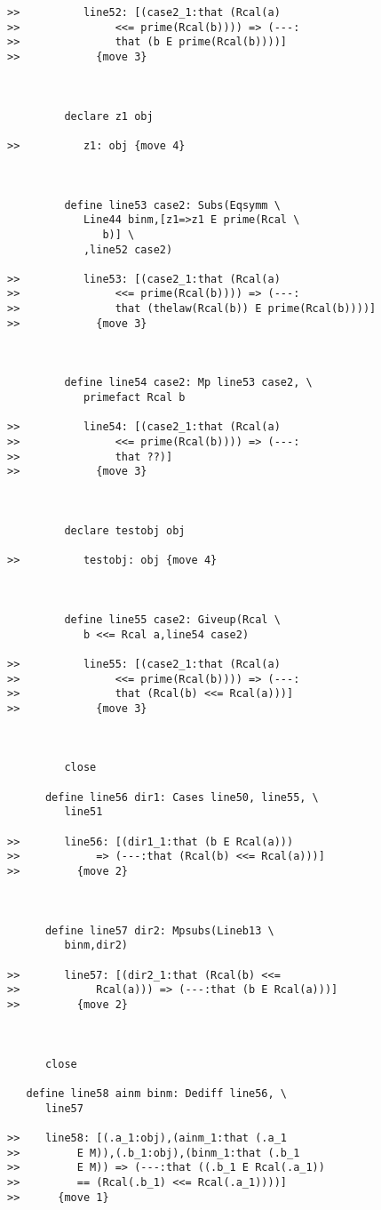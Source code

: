 \documentclass[12pt]{article}
\begin{document}
\begin{verbatim}
>>          line52: [(case2_1:that (Rcal(a)
>>               <<= prime(Rcal(b)))) => (---:
>>               that (b E prime(Rcal(b))))]
>>            {move 3}



         declare z1 obj

>>          z1: obj {move 4}



         define line53 case2: Subs(Eqsymm \
            Line44 binm,[z1=>z1 E prime(Rcal \
               b)] \
            ,line52 case2)

>>          line53: [(case2_1:that (Rcal(a)
>>               <<= prime(Rcal(b)))) => (---:
>>               that (thelaw(Rcal(b)) E prime(Rcal(b))))]
>>            {move 3}



         define line54 case2: Mp line53 case2, \
            primefact Rcal b

>>          line54: [(case2_1:that (Rcal(a)
>>               <<= prime(Rcal(b)))) => (---:
>>               that ??)]
>>            {move 3}



         declare testobj obj

>>          testobj: obj {move 4}



         define line55 case2: Giveup(Rcal \
            b <<= Rcal a,line54 case2)

>>          line55: [(case2_1:that (Rcal(a)
>>               <<= prime(Rcal(b)))) => (---:
>>               that (Rcal(b) <<= Rcal(a)))]
>>            {move 3}



         close

      define line56 dir1: Cases line50, line55, \
         line51

>>       line56: [(dir1_1:that (b E Rcal(a)))
>>            => (---:that (Rcal(b) <<= Rcal(a)))]
>>         {move 2}



      define line57 dir2: Mpsubs(Lineb13 \
         binm,dir2)

>>       line57: [(dir2_1:that (Rcal(b) <<=
>>            Rcal(a))) => (---:that (b E Rcal(a)))]
>>         {move 2}



      close

   define line58 ainm binm: Dediff line56, \
      line57

>>    line58: [(.a_1:obj),(ainm_1:that (.a_1
>>         E M)),(.b_1:obj),(binm_1:that (.b_1
>>         E M)) => (---:that ((.b_1 E Rcal(.a_1))
>>         == (Rcal(.b_1) <<= Rcal(.a_1))))]
>>      {move 1}




\end{verbatim}
\end{document}
